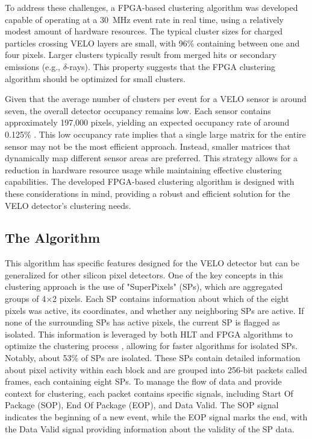 To address these challenges, a FPGA-based clustering algorithm was developed capable of operating at a \SI{30}{\mega\hertz} event rate in real time, using a relatively modest amount of hardware resources. The typical cluster sizes for charged particles crossing VELO layers are small, with 96\% containing between one and four pixels. Larger clusters typically result from merged hits or secondary emissions (e.g., $\delta$-rays). This property suggests that the FPGA clustering algorithm should be optimized for small clusters.

Given that the average number of clusters per event for a VELO sensor is around seven, the overall detector occupancy remains low. Each sensor contains approximately 197,000 pixels, yielding an expected occupancy rate of around 0.125\% \cite{Bediaga:2013tje}. This low occupancy rate implies that a single large matrix for the entire sensor may not be the most efficient approach. Instead, smaller matrices that dynamically map different sensor areas are preferred. This strategy allows for a reduction in hardware resource usage while maintaining effective clustering capabilities. The developed FPGA-based clustering algorithm is designed with these considerations in mind, providing a robust and efficient solution for the VELO detector's clustering needs.

\subsection*{The Algorithm}
This algorithm has specific features designed for the VELO detector but can be generalized for other silicon pixel detectors. One of the key concepts in this clustering approach is the use of "SuperPixels" (SPs), which are aggregated groups of 4×2 pixels. Each SP contains information about which of the eight pixels was active, its coordinates, and whether any neighboring SPs are active. If none of the surrounding SPs has active pixels, the current SP is flagged as isolated. This information is leveraged by both HLT and FPGA algorithms to optimize the clustering process , allowing for faster algorithms for isolated SPs. Notably, about 53\% of SPs are isolated.
These SPs contain detailed information about pixel activity within each block and are grouped into 256-bit packets called frames, each containing eight SPs. To manage the flow of data and provide context for clustering, each packet contains specific signals, including Start Of Package (SOP), End Of Package (EOP), and Data Valid. The SOP signal indicates the beginning of a new event, while the EOP signal marks the end, with the Data Valid signal providing information about the validity of the SP data.

